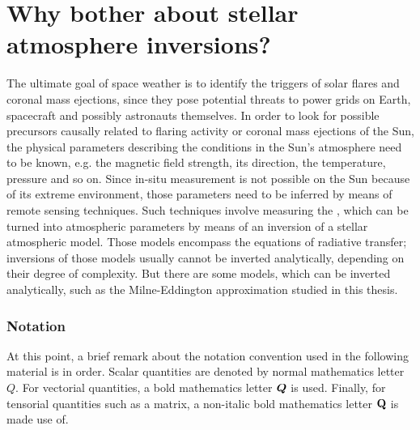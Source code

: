 \documentclass[a4paper,11pt]{report}
\def\fc#1{{\color{black}{#1}}} %
\def\lk#1{{\color{black}{#1}}}
\begin{document}
\section{Why bother about stellar atmosphere inversions?}
The ultimate goal of space weather is to identify the triggers of solar flares and coronal mass ejections, since they pose potential threats to power grids on Earth, spacecraft and possibly astronauts themselves. In order to look for possible precursors causally related to flaring activity or coronal mass ejections of the Sun, the physical parameters describing the conditions in the Sun's atmosphere need to be known, e.g. the magnetic field strength, its direction, the temperature, pressure and so on. Since in-situ measurement is not possible on the Sun because of its extreme environment, those parameters need to be inferred by means of remote sensing techniques. Such techniques involve measuring the \fc{intensity and polarization properties of light originating in the solar atmosphere}, which can be turned into atmospheric parameters by means of an inversion of a stellar atmospheric model. Those models encompass the equations of radiative transfer; inversions of those models usually cannot be inverted analytically, depending on their degree of complexity. But there are some models, which can be inverted analytically, such as the Milne-Eddington approximation studied in this thesis.








\subsubsection{Notation}
At this point, a brief remark about the notation convention used in the following material is in order. Scalar quantities are denoted by \lk{a} normal mathematics letter $Q$. For vectorial quantities, a bold mathematics letter $\bm{Q}$ is used. Finally, for tensorial quantities such as a matrix, a non-italic bold mathematics letter $\boldsymbol{\mathbf{Q}}$ is made use of.
\end{document}
